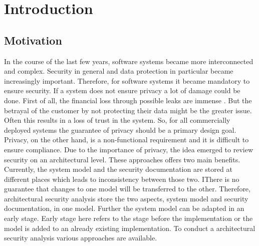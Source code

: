 
\chapter{Introduction}
\label{ch:Introduction}
\section{Motivation}
In the course of the last few years, software systems became more interconnected and complex. Security in general and data protection in particular became increasingly important. Therefore, for software systems it became mandatory to ensure security. If a system does not ensure privacy a lot of damage could be done.  First of all, the financial loss through possible leaks are immense \cite{privHarm}. But the betrayal of the customer by not protecting their data might be the greater issue. Often this results in a loss of trust in the system. So, for all commercially deployed systems the guarantee of privacy should be a primary design goal. Privacy, on the other hand, is a non-functional requirement and it is difficult to ensure compliance. Due to the importance of privacy, the idea emerged to review security on an architectural level. These approaches offers two main benefits. Currently, the system model and the security documentation are stored at different places which leads to inconsistency between those two. IThere is no guarantee that changes to one model will be transferred to the other. Therefore, architectural security analysis store the two aspects, system model and security documentation, in one model. Further the system model can be adapted in an early stage. Early stage here refers to the stage before the implementation or the model is added to an already existing implementation. To conduct a architectural security analysis various approaches are available. 



